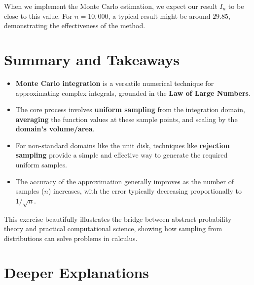 \documentclass[11pt,a4paper]{article}
\begin{document}
When we implement the Monte Carlo estimation, we expect our result $I_n$ to be close to this value. For $n=10,000$, a typical result might be around $29.85$, demonstrating the effectiveness of the method.

\section{Summary and Takeaways}

\begin{itemize}
    \item \textbf{Monte Carlo integration} is a versatile numerical technique for approximating complex integrals, grounded in the \textbf{Law of Large Numbers}.
    \item The core process involves \textbf{uniform sampling} from the integration domain, \textbf{averaging} the function values at these sample points, and scaling by the \textbf{domain's volume/area}.
    \item For non-standard domains like the unit disk, techniques like \textbf{rejection sampling} provide a simple and effective way to generate the required uniform samples.
    \item The accuracy of the approximation generally improves as the number of samples ($n$) increases, with the error typically decreasing proportionally to $1/\sqrt{n}$.
\end{itemize}

This exercise beautifully illustrates the bridge between abstract probability theory and practical computational science, showing how sampling from distributions can solve problems in calculus.

\newpage
\section{Deeper Explanations}
\label{sec:notes}
\end{document}
